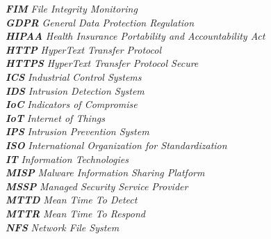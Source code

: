 \textbf{\textit{FIM}} \hspace{0.5cm} \textit{File Integrity Monitoring} \\
\textbf{\textit{GDPR}} \hspace{0.5cm} \textit{General Data Protection Regulation} \\
\textbf{\textit{HIPAA}} \hspace{0.5cm} \textit{Health Insurance Portability and Accountability Act} \\
\textbf{\textit{HTTP}} \hspace{0.5cm} \textit{HyperText Transfer Protocol} \\
\textbf{\textit{HTTPS}} \hspace{0.5cm} \textit{HyperText Transfer Protocol Secure} \\
\textbf{\textit{ICS}} \hspace{0.5cm} \textit{Industrial Control Systems} \\
\textbf{\textit{IDS}} \hspace{0.5cm} \textit{Intrusion Detection System} \\
\textbf{\textit{IoC}} \hspace{0.5cm} \textit{Indicators of Compromise} \\
\textbf{\textit{IoT}} \hspace{0.5cm} \textit{Internet of Things} \\
\textbf{\textit{IPS}} \hspace{0.5cm} \textit{Intrusion Prevention System} \\
\textbf{\textit{ISO}} \hspace{0.5cm} \textit{International Organization for Standardization} \\
\textbf{\textit{IT}} \hspace{0.5cm} \textit{Information Technologies} \\
\textbf{\textit{MISP}} \hspace{0.5cm} \textit{Malware Information Sharing Platform} \\
\textbf{\textit{MSSP}} \hspace{0.5cm} \textit{Managed Security Service Provider} \\
\textbf{\textit{MTTD}} \hspace{0.5cm} \textit{Mean Time To Detect} \\
\textbf{\textit{MTTR}} \hspace{0.5cm} \textit{Mean Time To Respond} \\
\textbf{\textit{NFS}} \hspace{0.5cm} \textit{Network File System} \\
